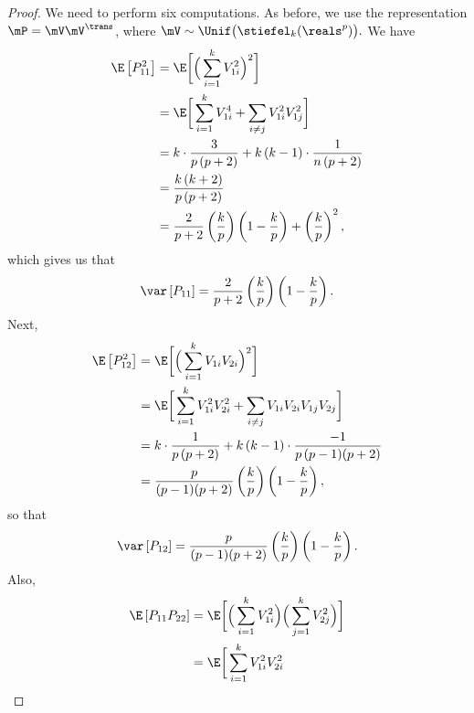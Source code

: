 \begin{proof}
    We need to perform six computations.  As before, we use the representation
    $\mP = \mV \mV^\trans$, where 
    \(
        \mV \sim \Unif\big( \stiefel_k(\reals^p) \big).
    \)
    We have
    \begin{align*}
        \E \left[ P_{11}^2 \right]
        &= \E \bigg[ \Big( 
                         \sum_{i=1}^k V_{1i}^2
                     \Big)^2
              \bigg] \\
        &= \E \bigg[
                  \sum_{i=1}^k V_{1i}^4
                  + \sum_{i\neq j} V_{1i}^2 V_{1j}^2
              \bigg] \\
        &= k \cdot \frac{3}{ p \, (p+2) } 
           + k \, (k-1) \cdot \frac{1}{ n \, (p+2) } \\
        &= \frac{ k \, (k+2) }{ p \,(p+2) } \\
        &= \frac{2}{ p+2}
           \left(\frac{k}{p}\right) \left( 1 - \frac{k}{p} \right)
           + \left( \frac{k}{p} \right)^2,
    \end{align*}
    which gives us that 
    \[
        \var \left[ P_{11} \right]
        = \frac{2}{ p+2 }
           \left(\frac{k}{p}\right) \left( 1 - \frac{k}{p} \right).
    \]
    Next,
    \begin{align*}
        \E \left[ P_{12}^2 \right]
        &= \E \bigg[ \Big( 
                         \sum_{i=1}^k V_{1i} V_{2i}
                     \Big)^2
              \bigg] \\
        &= \E \bigg[ 
                  \sum_{i=1}^k V_{1i}^2 V_{2i}^2
                  + \sum_{i\neq j} 
                        V_{1i} V_{2i} V_{1j} V_{2j}
              \bigg] \\
        &= k \cdot \frac{ 1 }{ p \, (p+2) }
           + k \, (k-1) \cdot \frac{-1}{ p \, (p-1) (p+2) } \\
        &= \frac{p}{ (p-1) (p+2) } 
           \left(\frac{k}{p}\right) \left( 1 - \frac{k}{p} \right),
    \end{align*}
    so that
    \[
        \var \left[ P_{12} \right]
        = \frac{p}{ (p-1) (p+2) } 
           \left(\frac{k}{p}\right) \left( 1 - \frac{k}{p} \right).
    \]
    Also,
    \begin{align*}
        \E \left[ P_{11} P_{22} \right]
        &= \E \bigg[
                \Big( \sum_{i=1}^k V_{1i}^2 \Big)
                \Big( \sum_{j=1}^k V_{2j}^2 \Big)
              \bigg] \\
        &= \E \bigg[
                  \sum_{i=1}^k V_{1i}^2 V_{2i}^2

\end{align*}
\end{proof}

